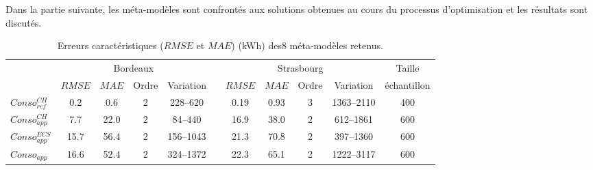 Dans la partie suivante, les méta-modèles sont confrontés aux solutions obtenues
au cours du processus d’optimisation et les résultats sont discutés.

\begin{table}
\centering
\caption[Erreurs caractéristiques des \num{8} méta-modèles retenus.]
        {Erreurs caractéristiques ($RMSE$ et $MAE$) (\si{kWh}) des\num{8} méta-modèles retenus.}
\label{tab:meta_result_bilan}
\begin{tabular}{l c c c c c c c c c c}
    \toprule
                    & \multicolumn{4}{c}{Bordeaux} & & \multicolumn{4}{c}{Strasbourg} &
                      Taille \\
                    \cmidrule(r){2-5}
                    \cmidrule(r){7-10}
                    & $RMSE$ & $MAE$  & Ordre & Variation  &       & $RMSE$ & $MAE$ & Ordre & Variation & échantillon \\
    \midrule
    $Conso_{ref}^{CH}$  & \num{0.2}  & \num{0.6}  & \num{2} & \numrange{228}{620}&   & \num{0.19}   & \num{0.93}  & \num{3}     & \numrange{1363}{2110}      & \num{400}  \\
    \addlinespace[\defaultaddspace]
    $Conso_{app}^{CH}$  & \num{7.7}  & \num{22.0} & \num{2} & \numrange{84}{440} &   & \num{16.9}   & \num{38.0}  & \num{2}     & \numrange{612}{1861}       & \num{600} \\
    \addlinespace[\defaultaddspace]
    $Conso_{app}^{ECS}$ & \num{15.7} & \num{56.4} & \num{2} & \numrange{156}{1043}&  & \num{21.3}   & \num{70.8}  & \num{2}     & \numrange{397}{1360}       & \num{600} \\
    \addlinespace[\defaultaddspace]
    $Conso_{app}$       & \num{16.6} & \num{52.4} & \num{2} & \numrange{324}{1372}&  & \num{22.3}   & \num{65.1}  & \num{2}     & \numrange{1222}{3117}       & \num{600} \\
    \bottomrule
\end{tabular}
\end{table}



